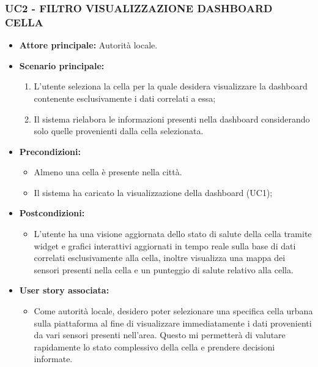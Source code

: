 \subsubsection{UC2 - FILTRO VISUALIZZAZIONE DASHBOARD CELLA}
\begin{itemize}
    \item \textbf{Attore principale:} Autorità locale.
    \item \textbf{Scenario principale:}
        \begin{enumerate}
            \item L'utente seleziona la cella per la quale desidera visualizzare la dashboard contenente esclusivamente i dati correlati a essa;
            \item Il sistema rielabora le informazioni presenti nella dashboard considerando solo quelle provenienti dalla cella selezionata.
        \end{enumerate}
    \item \textbf{Precondizioni:}
        \begin{itemize}
            \item  Almeno una cella è presente nella città.
            \item Il sistema ha caricato la visualizzazione della dashboard (UC1);
        \end{itemize}
    \item \textbf{Postcondizioni:}
        \begin{itemize}
            \item  L'utente ha una visione aggiornata dello stato di salute della cella tramite widget e grafici interattivi aggiornati in tempo reale sulla base di dati correlati esclusivamente alla cella, inoltre visualizza una mappa dei sensori presenti nella cella e un punteggio di salute relativo alla cella.
          \end{itemize}
    \item \textbf{User story associata:}
        \begin{itemize}
            \item Come autorità locale, desidero poter selezionare una specifica cella urbana sulla piattaforma al fine di visualizzare immediatamente i dati provenienti da vari sensori presenti nell'area. Questo mi permetterà di valutare rapidamente lo stato complessivo della cella e prendere decisioni informate.
        \end{itemize}
\end{itemize}
